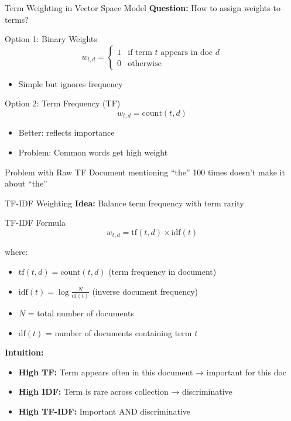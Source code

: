 \documentclass[aspectratio=169]{beamer}
\newif\ifanimated
\newcommand{\cpause}{\ifanimated\pause\fi}
\begin{document}
\begin{frame}[shrink=10]{Term Weighting in Vector Space Model}
\textbf{Question:} How to assign weights to terms?

\vspace{1em}

\begin{block}{Option 1: Binary Weights}
$$w_{t,d} = \begin{cases} 1 & \text{if term } t \text{ appears in doc } d \\ 0 & \text{otherwise} \end{cases}$$
\begin{itemize}
    \item Simple but ignores frequency
\end{itemize}
\cpause
\end{block}
\cpause
\begin{block}{Option 2: Term Frequency (TF)}
$$w_{t,d} = \text{count}(t, d)$$
\begin{itemize}
    \item Better: reflects importance
    \item Problem: Common words get high weight
\end{itemize}
\cpause
\end{block}
\cpause
\begin{alertblock}{Problem with Raw TF}
Document mentioning ``the'' 100 times doesn't make it about ``the''
\end{alertblock}
\cpause
\end{frame}

\begin{frame}[shrink=10]{TF-IDF Weighting}
\textbf{Idea:} Balance term frequency with term rarity

\vspace{1em}

\begin{block}{TF-IDF Formula}
$$w_{t,d} = \text{tf}(t,d) \times \text{idf}(t)$$

where:
\begin{itemize}
    \item $\text{tf}(t,d) = \text{count}(t,d)$ (term frequency in document)
    \item $\text{idf}(t) = \log\frac{N}{\text{df}(t)}$ (inverse document frequency)
    \item $N$ = total number of documents
    \item $\text{df}(t)$ = number of documents containing term $t$
\end{itemize}
\cpause
\end{block}
\cpause
\vspace{1em}

\textbf{Intuition:}
\begin{itemize}
    \item \textbf{High TF:} Term appears often in this document → important for this doc
    \item \textbf{High IDF:} Term is rare across collection → discriminative
    \item \textbf{High TF-IDF:} Important AND discriminative
\end{itemize}
\end{frame}
\end{document}
